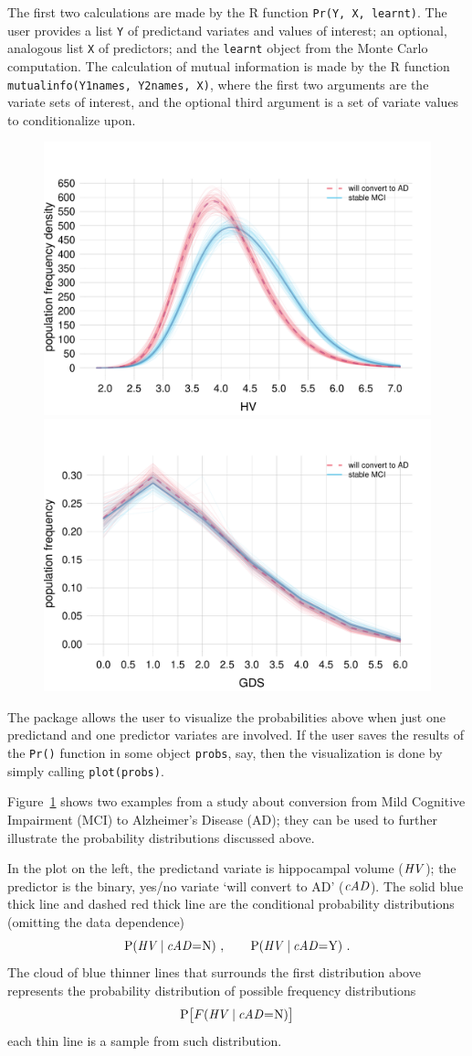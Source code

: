 The first two calculations are made by the R function \texttt{Pr(Y, X, learnt)}. The user provides a list \texttt{Y} of predictand variates and values of interest; an optional, analogous list \texttt{X} of predictors; and the \texttt{learnt} object from the Monte Carlo computation. The calculation of mutual information is made by the R function \texttt{mutualinfo(Y1names, Y2names, X)}, where the first two arguments are the variate sets of interest, and the optional third argument is a set of variate values to conditionalize upon.

\medskip

\begin{figure}[t]
\centering%
\includegraphics[width=0.45\linewidth]{figures/population_distr_HV.pdf}\hfill%
\includegraphics[width=0.45\linewidth]{figures/population_distr_GDS.pdf}%
\\ \caption{}\label{fig:distr}
\end{figure}
The package allows the user to visualize the probabilities above when just one predictand and one predictor variates are involved. If the user saves the results of the \texttt{Pr()} function in some object \texttt{probs}, say, then the visualization is done by simply calling \texttt{plot(probs)}.

Figure~\ref{fig:distr} shows two examples from a study \citep{portamanaetal2023b} about conversion from Mild Cognitive Impairment (MCI) to Alzheimer's Disease (AD); they can be used to further illustrate the probability distributions discussed above.

In the plot on the left, the predictand variate is hippocampal volume ($\mathit{HV}$); the predictor is the binary, yes/no variate `will convert to AD' ($\mathit{cAD}$). The solid blue thick line and dashed red thick line are the conditional probability distributions (omitting the data dependence)
\begin{equation*}
  \P( \HV \| \cAD \mo \yn)\ ,\qquad
  \P( \HV \| \cAD \mo \yy) \ .
\end{equation*}
The cloud of blue thinner lines that surrounds the first distribution above  represents the probability distribution of possible frequency distributions
\begin{equation*}
  \P\bigl[ \yF(\HV \| \cAD \mo \yn)\bigr]
\end{equation*}
each thin line is a sample from such distribution.

